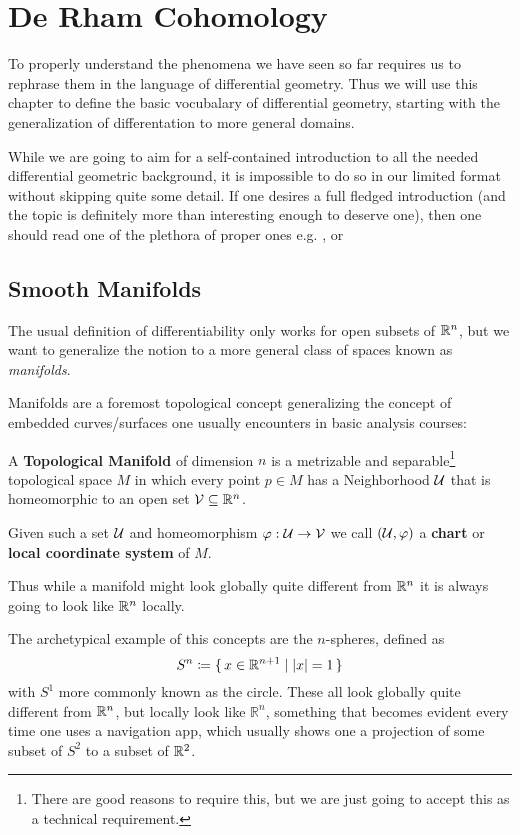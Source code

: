 \chapter{De Rham Cohomology}
To properly understand the phenomena we have seen so far requires us to rephrase them in the language of
differential geometry. Thus we will use this chapter to define the basic vocubalary of differential geometry,
starting with the generalization of differentation to more general domains.


While we are going to aim for a self-contained introduction to all the needed differential geometric
background, it is impossible to do so in our limited format without skipping quite some detail. If one desires a full fledged
introduction (and the topic is definitely more than interesting enough to deserve one), then one should
read one of the plethora of proper ones e.g. \cite{lee_introduction_2013},
\cite{spivak_comprehensive_1979} or \cite{wendl_differential_2022}

\section{Smooth Manifolds}
The usual definition of differentiability only works for open subsets of $\mathbb{R}^n$, but
we want to generalize the notion to a more general class of spaces known as 
\textit{manifolds}.

Manifolds are a foremost topological concept generalizing the concept of embedded
curves/surfaces one usually encounters in basic analysis courses:
\begin{definition}
A \textbf{Topological Manifold} of dimension $n$ is a metrizable and separable\footnote{
	There are good reasons to require this, but we are just going to accept this as a technical requirement.
}
topological space $M$ in which every point $p \in M$ has a Neighborhood $\mathcal{U}$ that is homeomorphic to
an open set $\mathcal{V} \subseteq \mathbb{R}^n$.

Given such a set $\mathcal{U}$ and homeomorphism $\varphi: \mathcal{U} \to \mathcal{V}$ we call $(\mathcal{U}, \varphi)$ a \textbf{chart}
or \textbf{local coordinate system} of $M$.
\end{definition}
Thus while a manifold might look globally quite different from $\mathbb{R}^n$ it is always
going to look like $\mathbb{R}^n$ locally.

The archetypical example of this concepts are the $n$-spheres, defined as
\[
	S^n \coloneqq \{\, x \in \mathbb{R}^{n + 1} \mid |x| = 1 \,\}
\]
with $S^1$ more commonly known as the circle. These all look globally quite different
from $\mathbb{R}^n$, but locally look like $\mathbb{R}^n$, something that becomes evident
every time one uses a navigation app, which usually shows one a projection of some
subset of $S^2$ to a subset of $\mathbb{R}^2$.

